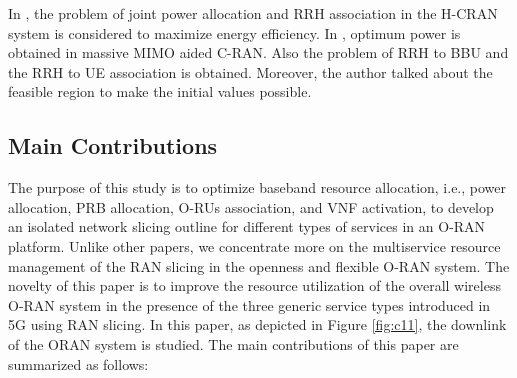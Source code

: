 \documentclass[lettersize,journal]{IEEEtran}
\begin{document}
In \cite{ali2019energy,ali2019energy1,ali2018joint}, the problem of joint power allocation and RRH association in the H-CRAN system is considered to maximize energy efficiency.
In \cite{amani2019power}, optimum power is obtained in massive MIMO aided C-RAN. Also the problem of RRH to BBU and the RRH to UE association is obtained. Moreover, the author talked about the feasible region to make the initial values possible.
\subsection{Main Contributions}
The purpose of this study is to optimize baseband resource allocation, i.e., power allocation, PRB allocation, O-RUs association, and VNF activation, to develop an isolated network slicing outline for different types of services in an O-RAN platform.
Unlike other papers, we concentrate more on the multiservice resource management of the RAN slicing in the openness and flexible O-RAN system.
The novelty of this paper is to improve the resource utilization of the overall wireless O-RAN system in the presence of the three generic service types introduced in 5G using RAN slicing.
In this paper, as depicted in Figure \ref{fig:c11}, the downlink of the ORAN system is studied. The main contributions of this paper are summarized as follows:
\end{document}
